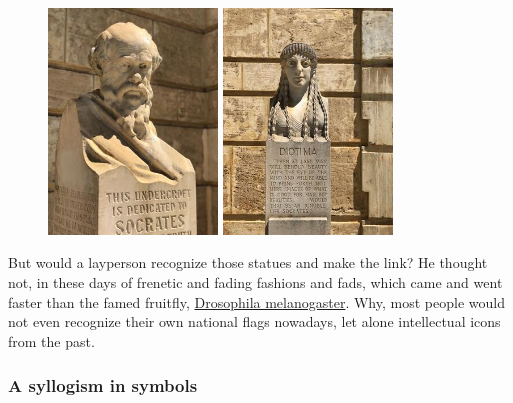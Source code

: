 \documentclass[
  12pt,
  british,
  a4paper,
]{article}
\begin{document}
\begin{figure}[h]
  \begin{minipage}[b]{0.5\textwidth}
    \centering
    \includegraphics[height=60mm]{images/socrates-close-up.jpg}
  \end{minipage}\hfill
  \begin{minipage}[b]{0.5\textwidth}
    \centering
    \includegraphics[height=60mm]{images/diotima-2.jpg}
  \end{minipage}
\end{figure}

But would a layperson recognize those statues and make the link? He
thought not, in these days of frenetic and fading fashions and fads,
which came and went faster than the famed fruitfly,
\href{https://en.wikipedia.org/wiki/Drosophila_melanogaster\#Lifecycle_and_reproduction}{Drosophila
melanogaster}. Why, most people would not even recognize their own
national flags nowadays, let alone intellectual icons from the past.

\hypertarget{a-syllogism-in-symbols}{%
\subsubsection{A syllogism in symbols}\label{a-syllogism-in-symbols}}
\end{document}
